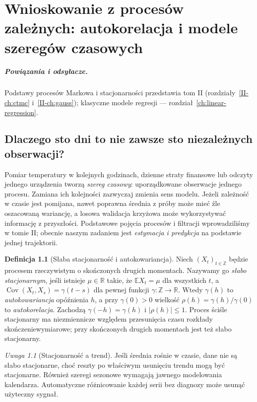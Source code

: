 \documentclass[11pt,a4paper,oneside]{report}
\numberwithin{equation}{chapter}
\theoremstyle{plain}
\theoremstyle{definition}
\newtheorem{definicja}{Definicja}[chapter]
\theoremstyle{remark}
\newtheorem{uwaga}{Uwaga}[chapter]
\newcommand{\R}{\mathbb R}
\newcommand{\E}{\mathbb E}
\newcommand{\Cov}{\operatorname{Cov}}
\begin{document}
\chapter{Wnioskowanie z procesów zależnych: autokorelacja i modele szeregów czasowych}
\label{ch:time-series}
\paragraph{Powiązania i odsyłacze.} Podstawy procesów Markowa i stacjonarności przedstawia tom II (rozdziały~\ref{II-ch:ctmc} i~\ref{II-ch:gauss}); klasyczne modele regresji — rozdział~\ref{ch:linear-regression}.


\section{Dlaczego sto dni to nie zawsze sto niezależnych obserwacji?}
Pomiar temperatury w kolejnych godzinach, dzienne straty
finansowe lub odczyty jednego urządzenia tworzą \emph{szereg czasowy}:
uporządkowane obserwacje jednego procesu. Zamiana ich kolejności
zazwyczaj zmienia sens modelu. Jeżeli zależność w czasie jest
pomijana, nawet poprawna średnia z próby może mieć źle oszacowaną
wariancję, a losowa walidacja krzyżowa może wykorzystywać
informację z przyszłości. Podstawowe pojęcia procesów i
filtracji wprowadziliśmy w tomie II; obecnie naszym zadaniem
jest \emph{estymacja i predykcja} na podstawie jednej trajektorii.

\begin{definicja}[Słaba stacjonarność i autokowariancja]
\label{def:weak-stationarity}
Niech $(X_t)_{t\in\mathbb Z}$ będzie procesem rzeczywistym
o skończonych drugich momentach. Nazywamy go \emph{słabo
stacjonarnym}, jeśli istnieje $\mu\in\R$ takie, że
$\E X_t=\mu$ dla wszystkich $t$, a
$\Cov(X_t,X_s)=\gamma(t-s)$ dla pewnej funkcji
$\gamma:\mathbb Z\to\R$. Wtedy $\gamma(h)$ to
\emph{autokowariancja} opóźnienia $h$, a przy
$\gamma(0)>0$ wielkość $\rho(h)=\gamma(h)/\gamma(0)$
to \emph{autokorelacja}. Zachodzą $\gamma(-h)=\gamma(h)$
i $|\rho(h)|\le1$. Proces ściśle stacjonarny ma
niezmiennicze względem przesunięcia czasu rozkłady
skończeniewymiarowe; przy skończonych drugich momentach
jest też słabo stacjonarny.
\end{definicja}

\begin{uwaga}[Stacjonarność a trend]
Jeśli średnia rośnie w czasie, dane nie są słabo
stacjonarne, choć reszty po właściwym usunięciu trendu
mogą być stacjonarne. Również szeregi sezonowe wymagają
jawnego modelowania kalendarza. Automatyczne różnicowanie
każdej serii bez diagnozy może usunąć użyteczny sygnał.
\end{uwaga}
\end{document}
